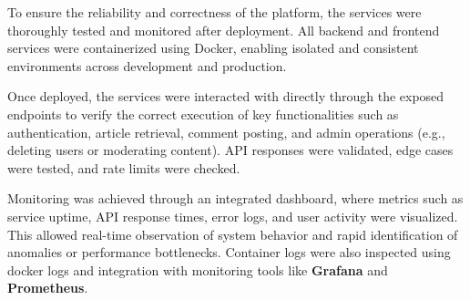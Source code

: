 To ensure the reliability and correctness of the platform, the services were thoroughly tested and monitored after deployment.
All backend and frontend services were containerized using Docker, enabling isolated and consistent environments across development and production.

Once deployed, the services were interacted with directly through the exposed endpoints to verify the correct execution of key functionalities such as authentication,
article retrieval, comment posting, and admin operations (e.g., deleting users\cite{randomuser} or moderating content).
API responses were validated, edge cases were tested, and rate limits were checked.

Monitoring was achieved through an integrated dashboard, where metrics such as service uptime, API response times, error logs, and user activity were visualized.
This allowed real-time observation of system behavior and rapid identification of anomalies or performance bottlenecks.
Container logs were also inspected using docker logs and integration with monitoring tools like \textbf{Grafana} and \textbf{Prometheus}.



